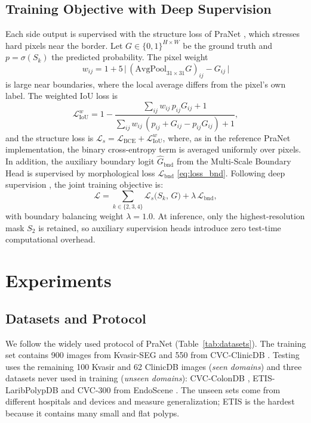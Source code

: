 \documentclass[journal]{IEEEtran}
\begin{document}
\subsection{Training Objective with Deep Supervision}
Each side output is supervised with the structure loss of PraNet \cite{fan2020pranet,wei2020f3net}, which stresses hard pixels near the border. Let $G\in\{0,1\}^{H\times W}$ be the ground truth and $p=\sigma(S_k)$ the predicted probability. The pixel weight
\begin{equation}
  w_{ij} = 1 + 5\,\big|\,(\mathrm{AvgPool}_{31\times31}G)_{ij} - G_{ij}\,\big|
  \label{eq:weight}
\end{equation}
is large near boundaries, where the local average differs from the pixel's own label. The weighted IoU loss is
\begin{equation}
  \mathcal{L}^{w}_{\text{IoU}} = 1-\frac{\sum_{ij}w_{ij}\,p_{ij}G_{ij}+1}{\sum_{ij}w_{ij}\,(p_{ij}+G_{ij}-p_{ij}G_{ij})+1},
  \label{eq:wiou}
\end{equation}
and the structure loss is $\mathcal{L}_{s}=\mathcal{L}_{\text{BCE}}+\mathcal{L}^{w}_{\text{IoU}}$, where, as in the reference PraNet implementation, the binary cross-entropy term is averaged uniformly over pixels. In addition, the auxiliary boundary logit $\hat{G}_{\text{bnd}}$ from the Multi-Scale Boundary Head is supervised by morphological loss $\mathcal{L}_{\text{bnd}}$ \eqref{eq:loss_bnd}. Following deep supervision \cite{lee2015dsn}, the joint training objective is:
\begin{equation}
  \mathcal{L} = \sum_{k\in\{2,3,4\}} \mathcal{L}_{s}\big(S_k,\,G\big) + \lambda\,\mathcal{L}_{\text{bnd}},
  \label{eq:total}
\end{equation}
with boundary balancing weight $\lambda=1.0$. At inference, only the highest-resolution mask $S_2$ is retained, so auxiliary supervision heads introduce zero test-time computational overhead.

\section{Experiments}
\label{sec:exp}

\subsection{Datasets and Protocol}
We follow the widely used protocol of PraNet \cite{fan2020pranet} (Table~\ref{tab:datasets}). The training set contains 900 images from Kvasir-SEG \cite{jha2020kvasir} and 550 from CVC-ClinicDB \cite{bernal2015clinicdb}. Testing uses the remaining 100 Kvasir and 62 ClinicDB images (\emph{seen domains}) and three datasets never used in training (\emph{unseen domains}): CVC-ColonDB \cite{tajbakhsh2016colondb}, ETIS-LaribPolypDB \cite{silva2014etis} and CVC-300 from EndoScene \cite{vazquez2017endoscene}. The unseen sets come from different hospitals and devices and measure generalization; ETIS is the hardest because it contains many small and flat polyps.
\end{document}
